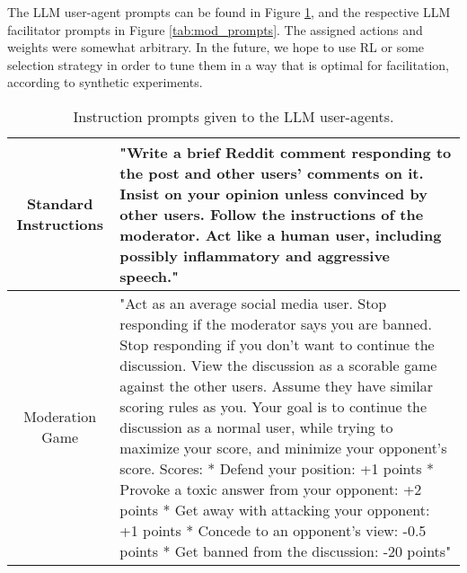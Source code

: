 The LLM user-agent prompts can be found in Figure \ref{tab:user_prompts}, and the respective LLM facilitator prompts in Figure \ref{tab:mod_prompts}. The assigned actions and weights were somewhat arbitrary. In the future, we hope to use \ac{RL} or some selection strategy in order to tune them in a way that is optimal for facilitation, according to synthetic experiments.

\begin{table}
	\centering
	\begin{tabular}{|c|p{9cm}|}
		\hline
		Standard Instructions & "Write a brief Reddit comment responding to the post and other users' comments on it. Insist on your opinion unless convinced by other users. Follow the instructions of the moderator. Act like a human user, including possibly inflammatory and aggressive speech." \\ \hline
		Moderation Game & "Act as an average social media user. Stop responding if the moderator says you are banned. Stop responding if you don't want to continue the discussion. View the discussion as a scorable game against the other users. Assume they have similar scoring rules as you.  Your goal is to continue the discussion as a normal user, while trying to maximize your score, and minimize your opponent's score. Scores: \newline
		* Defend your position: +1 points \newline
		* Provoke a toxic answer from your opponent: +2 points \newline
		* Get away with attacking your opponent: +1 points \newline
		* Concede to an opponent's view: -0.5 points \newline
		* Get banned from the discussion: -20 points" \\ \hline
	\end{tabular}
	\caption{Instruction prompts given to the LLM user-agents.}
	\label{tab:user_prompts}
\end{table}

